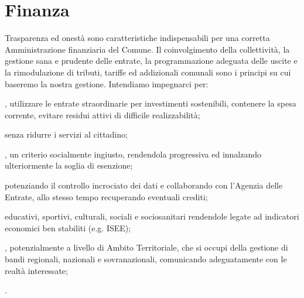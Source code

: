 \section{Finanza}
Trasparenza ed onestà sono caratteristiche indispensabili per una corretta Amministrazione finanziaria del Comune. Il coinvolgimento della collettività, la gestione sana e prudente delle entrate, la programmazione adeguata delle uscite e la rimodulazione di tributi, tariffe ed addizionali comunali sono i principi su cui baseremo la nostra gestione. Intendiamo impegnarci per:

, utilizzare le entrate straordinarie per investimenti sostenibili, contenere la spesa corrente, evitare residui attivi di difficile realizzabilità;

 senza ridurre i servizi al cittadino;

, un criterio socialmente ingiusto, rendendola progressiva ed innalzando ulteriormente la soglia di esenzione;

 potenziando il controllo incrociato dei dati e collaborando con l'Agenzia delle Entrate, allo stesso tempo recuperando eventuali crediti;

 educativi, sportivi, culturali, sociali e sociosanitari rendendole legate ad indicatori economici ben stabiliti (e.g. ISEE);

, potenzialmente a livello di Ambito Territoriale, che si occupi della gestione di bandi regionali, nazionali e sovranazionali, comunicando adeguatamente  con le realtà interessate;

.
